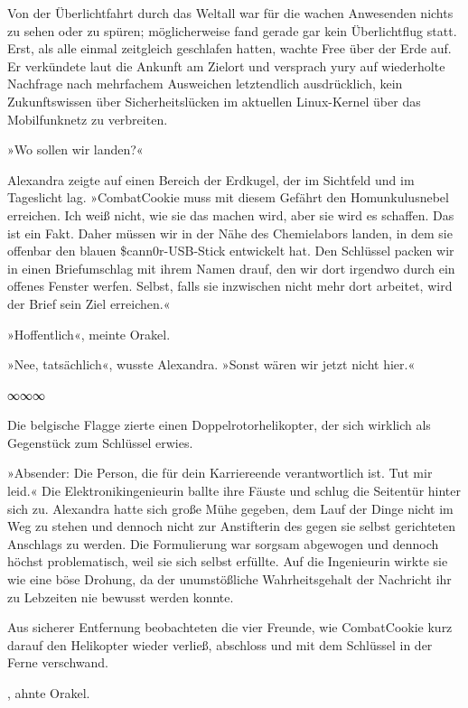 Von der Überlichtfahrt durch das Weltall war für die wachen Anwesenden nichts zu sehen oder zu spüren; möglicherweise fand gerade gar kein Überlichtflug statt. Erst, als alle einmal zeitgleich geschlafen hatten, wachte Free über der Erde auf. Er verkündete laut die Ankunft am Zielort und versprach yury auf wiederholte Nachfrage nach mehrfachem Ausweichen letztendlich ausdrücklich, kein Zukunftswissen über Sicherheitslücken im aktuellen Linux-Kernel über das Mobilfunknetz zu verbreiten.

»Wo sollen wir landen?«

Alexandra zeigte auf einen Bereich der Erdkugel, der im Sichtfeld und im Tageslicht lag. »CombatCookie muss mit diesem Gefährt den Homunkulusnebel erreichen. Ich weiß nicht, wie sie das machen wird, aber sie wird es schaffen. Das ist ein Fakt. Daher müssen wir in der Nähe des Chemielabors landen, in dem sie offenbar den blauen \$cann0r-USB-Stick entwickelt hat. Den Schlüssel packen wir in einen Briefumschlag mit ihrem Namen drauf, den wir dort irgendwo durch ein offenes Fenster werfen. Selbst, falls sie inzwischen nicht mehr dort arbeitet, wird der Brief sein Ziel erreichen.«

»Hoffentlich«, meinte Orakel.

»Nee, tatsächlich«, wusste Alexandra. »Sonst wären wir jetzt nicht hier.«

\begin{center}
∞∞∞
\end{center}

Die belgische Flagge zierte einen Doppelrotorhelikopter, der sich wirklich als Gegenstück zum Schlüssel erwies.

»Absender: Die Person, die für dein Karriereende verantwortlich ist. Tut mir leid.« Die Elektronikingenieurin ballte ihre Fäuste und schlug die Seitentür hinter sich zu. Alexandra hatte sich große Mühe gegeben, dem Lauf der Dinge nicht im Weg zu stehen und dennoch nicht zur Anstifterin des gegen sie selbst gerichteten Anschlags zu werden. Die Formulierung war sorgsam abgewogen und dennoch höchst problematisch, weil sie sich selbst erfüllte. Auf die Ingenieurin wirkte sie wie eine böse Drohung, da der unumstößliche Wahrheitsgehalt der Nachricht ihr zu Lebzeiten nie bewusst werden konnte.

Aus sicherer Entfernung beobachteten die vier Freunde, wie CombatCookie kurz darauf den Helikopter wieder verließ, abschloss und mit dem Schlüssel in der Ferne verschwand.

, ahnte Orakel. 

